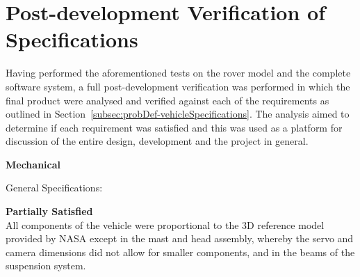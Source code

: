 \section{Post-development Verification of Specifications}
  Having performed the aforementioned tests on the rover model and the complete software system, a full post-development verification was performed in which the final product were analysed and verified against each of the requirements as outlined in Section~\ref{subsec:probDef-vehicleSpecifications}. The analysis aimed to determine if each requirement was satisfied and this was used as a platform for discussion of the entire design, development and the project in general.
  
  \begin{itemize}
    \item \textbf{Mechanical}
    \begin{RM}
      \item General Specifications:
      \begin{RM}
        \item \textbf{Partially Satisfied}\\
        All components of the vehicle were proportional to the 3D reference model \cite{nasa3Dprint} provided by NASA except in the mast and head assembly, whereby the servo and camera dimensions did not allow for smaller components, and in the beams of the suspension system.
        

\end{RM}
\end{RM}
\end{itemize}
